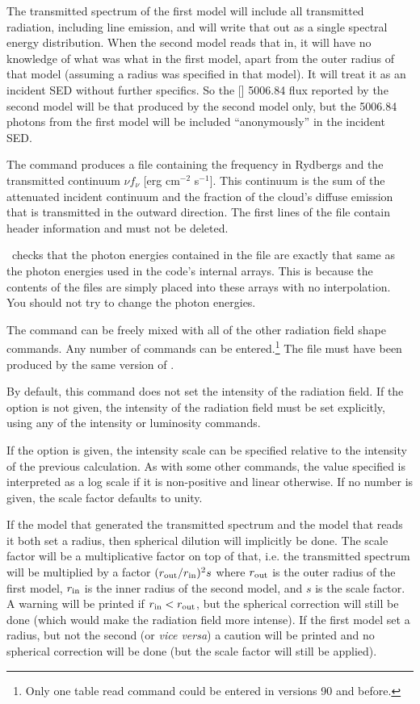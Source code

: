 The transmitted spectrum of the first model
will include all transmitted radiation, including line emission, and
will write that out as a single spectral energy distribution. When the
second model reads that in, it will have no knowledge of what was what
in the first model, apart from the outer radius of that model
(assuming a radius was specified in that model).
It will treat it as an incident SED without further
specifics. So the [\oiii ] 5006.84 flux reported by the second model will be
that produced by the second model only, but the 5006.84 photons from the
first model will be included ``anonymously'' in the incident SED.

The  command produces a file containing the frequency in Rydbergs and the transmitted
continuum $\nu f_{\nu}$ [erg cm$^{-2}$ s$^{-1}$].
This continuum is the sum of the attenuated
incident continuum and the fraction of the cloud's diffuse emission
that is transmitted in the outward direction.  The first lines of the 
file contain header information and must not be deleted.

\Cloudy\ checks that the photon energies contained in the
 file are exactly that same as
the photon energies used in the code's internal arrays.  
This is because the contents of the files are simply placed into these arrays with
no interpolation.  You should not try to change the photon energies.

The  command can be freely mixed with all
of the other radiation field shape commands.
Any number of  commands can be entered.\footnote{Only one table read command could be entered in versions
90 and before.}
The  file must have been produced by the same version of \Cloudy.

By default, this command does not set the intensity of the radiation
field.  If the  option is not given, the intensity of the
radiation field must be set explicitly, using any of the intensity or
luminosity commands.

If the  option is given, the
intensity scale can be specified relative to the intensity of the previous
calculation.  As with some other  commands, the value
specified is interpreted as a log scale if it is non-positive and linear
otherwise. If no number is given, the scale factor defaults to unity.

If the model that generated the transmitted spectrum and the model that reads
it both set a radius, then spherical dilution will implicitly be done. The
scale factor will be a multiplicative factor on top of that, i.e. the
transmitted spectrum will be multiplied by a factor $(r_{\rm out}/r_{\rm
  in})^2 s$ where $r_{\rm out}$ is the outer radius of the first model,
$r_{\rm in}$ is the inner radius of the second model, and $s$ is the scale
factor. A warning will be printed if $r_{\rm in} < r_{\rm out}$, but the
spherical correction will still be done (which would make the radiation field
more intense). If the first model set a radius, but not the second (or {\it
  vice versa}) a caution will be printed and no spherical correction will be
done (but the scale factor will still be applied).

